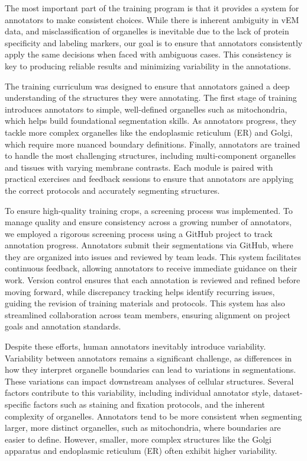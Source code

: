 \documentclass[times, twoside]{zHenriquesLab-StyleBioRxiv}
\begin{document}
The most important part of the training program is that it provides a system for annotators to make consistent choices. While there is inherent ambiguity in vEM data, and misclassification of organelles is inevitable due to the lack of protein specificity and labeling markers, our goal is to ensure that annotators consistently apply the same decisions when faced with ambiguous cases. This consistency is key to producing reliable results and minimizing variability in the annotations.

The training curriculum was designed to ensure that annotators gained a deep understanding of the structures they were annotating. The first stage of training introduces annotators to simple, well-defined organelles such as mitochondria, which helps build foundational segmentation skills. As annotators progress, they tackle more complex organelles like the endoplasmic reticulum (ER) and Golgi, which require more nuanced boundary definitions. Finally, annotators are trained to handle the most challenging structures, including multi-component organelles and tissues with varying membrane contrasts. Each module is paired with practical exercises and feedback sessions to ensure that annotators are applying the correct protocols and accurately segmenting structures.

To ensure high-quality training crops, a screening process was implemented. To manage quality and ensure consistency across a growing number of annotators, we employed a rigorous screening process using a GitHub project to track annotation progress. Annotators submit their segmentations via GitHub, where they are organized into issues and reviewed by team leads. This system facilitates continuous feedback, allowing annotators to receive immediate guidance on their work. Version control ensures that each annotation is reviewed and refined before moving forward, while discrepancy tracking helps identify recurring issues, guiding the revision of training materials and protocols. This system has also streamlined collaboration across team members, ensuring alignment on project goals and annotation standards.

Despite these efforts, human annotators inevitably introduce variability. Variability between annotators remains a significant challenge, as differences in how they interpret organelle boundaries can lead to variations in segmentations. These variations can impact downstream analyses of cellular structures. Several factors contribute to this variability, including individual annotator style, dataset-specific factors such as staining and fixation protocols, and the inherent complexity of organelles. Annotators tend to be more consistent when segmenting larger, more distinct organelles, such as mitochondria, where boundaries are easier to define. However, smaller, more complex structures like the Golgi apparatus and endoplasmic reticulum (ER) often exhibit higher variability.
\end{document}
